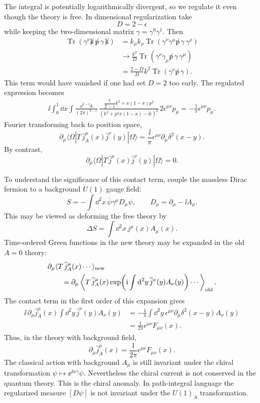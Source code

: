 The integral is potentially logarithmically divergent, so we regulate it
even though the theory is free.  In dimensional regularization take
\[
  D=2-\epsilon
\]
while keeping the two-dimensional matrix
\(\gamma=\gamma^0\gamma^1\).  Then
\[
\begin{aligned}
  \operatorname{Tr}(\gamma^\nu\not k\,\not p\,\gamma\,\not k)
  &=
  k_\mu k_\rho
  \operatorname{Tr}(\gamma^\nu\gamma^\mu\not p\,\gamma\,\gamma^\rho)
\\
  &\longrightarrow
  \frac{k^2}{D}
  \operatorname{Tr}(\gamma^\nu\gamma_\mu\not p\,\gamma\,\gamma^\mu)
\\
  &=
  \frac{2-D}{D}k^2
  \operatorname{Tr}(\gamma^\nu\not p\,\gamma).
\end{aligned}
\]
This term would have vanished if one had set \(D=2\) too early.  The
regulated expression becomes
\[
\begin{aligned}
  \ii\int_0^1\dd x
  \int\frac{\dd^{2-\epsilon}k}{(2\pi)^{2-\epsilon}}\,
  \frac{
    \dfrac{\epsilon}{2-\epsilon}k^2
    +x(1-x)p^2
  }{(k^2+p^2x(1-x)-\ii\epsilon)^2}\,
  2\epsilon^{\mu\nu}p_\mu
  =
  -\frac1{\pi}\epsilon^{\mu\nu}p_\mu .
\end{aligned}
\]
Fourier transforming back to position space,
\[
  \partial_\mu
  \langle\Omega|T\,\widehat j_A^\mu(x)\widehat j^\nu(y)|\Omega\rangle
  =
  \frac{\ii}{\pi}\epsilon^{\mu\nu}\partial_\mu\delta^2(x-y).
\]
By contrast,
\[
  \partial_\mu
  \langle\Omega|T\,\widehat j^\mu(x)\widehat j^\nu(y)|\Omega\rangle
  =
  0.
\]

To understand the significance of this contact term, couple the massless
Dirac fermion to a background \(U(1)\) gauge field:
\[
  S=-\int\dd^2x\,\overline\psi\gamma^\mu D_\mu\psi,
  \qquad
  D_\mu=\partial_\mu-\ii A_\mu .
\]
This may be viewed as deforming the free theory by
\[
  \Delta S=\int\dd^2x\,j^\mu(x)A_\mu(x).
\]
Time-ordered Green functions in the new theory may be expanded in the old
\(A=0\) theory:
\[
\begin{aligned}
  &\partial_\mu
  \langle T\,\widehat j_A^\mu(x)\cdots\rangle_{\rm new}
\\
  &\qquad =
  \partial_\mu
  \left\langle
    T\,\widehat j_A^\mu(x)
    \exp\!\left(
      \mathrm{i}\int\mathrm{d}^2y\,\widehat j^\nu(y)A_\nu(y)
    \right)
    \cdots
  \right\rangle_{\rm old}.
\end{aligned}
\]
The contact term in the first order of this expansion gives
\[
\begin{aligned}
  \ii\,\partial_\mu\widehat j_A^\mu(x)
  \int\dd^2y\,\widehat j^\nu(y)A_\nu(y)
  &=
  -\frac1{\pi}
  \int\dd^2y\,
  \epsilon^{\mu\nu}\partial_\mu\delta^2(x-y)A_\nu(y)
\\
  &=
  \frac1{2\pi}\epsilon^{\mu\nu}F_{\mu\nu}(x).
\end{aligned}
\]
Thus, in the theory with background field,
\[
  \partial_\mu\widehat j_A^\mu(x)
  =
  \frac1{2\pi}\epsilon^{\mu\nu}F_{\mu\nu}(x).
\]
The classical action with background \(A_\mu\) is still invariant under
the chiral transformation
\(\psi\mapsto\ee^{\ii\alpha\gamma}\psi\).  Nevertheless the chiral
current is not conserved in the quantum theory.  This is the chiral
anomaly.  In path-integral language the regularized measure
\([D\psi]\) is not invariant under the \(U(1)_A\) transformation.

